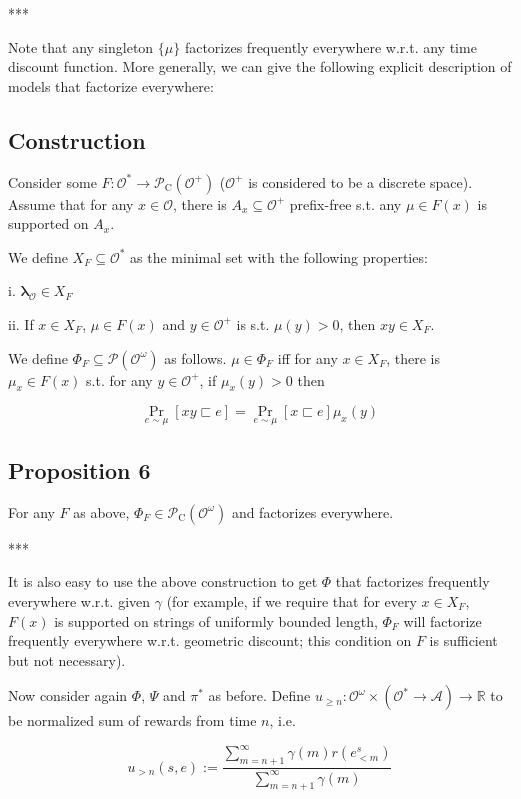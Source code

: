 \documentclass[a4paper]{article}
\DeclareMathOperator{\Prb}{Pr}
\newcommand{\Reals}{\mathbb{R}}
\newcommand{\Estr}{\bm{\lambda}}
\newcommand{\Prob}{\mathcal{P}}
\newcommand{\Act}{\mathcal{A}}
\newcommand{\Obs}{\mathcal{O}}
\newcommand{\ObsO}{\Obs^\omega}
\newcommand{\Pol}{\Obs^* \rightarrow \Act}
\newcommand{\CC}{\mathcal{P}_{\operatorname{C}}}
\begin{document}
***

Note that any singleton ${\{\mu\}}$ factorizes frequently everywhere w.r.t. any time discount function. More generally, we can give the following explicit description of models that factorize everywhere:

\subsection{Construction}

Consider some ${F: \Obs^* \rightarrow \CC(\Obs^+)}$ (${\Obs^+}$ is considered to be a discrete space). Assume that for any ${x \in \Obs}$, there is ${A_x \subseteq \Obs^+}$ prefix-free s.t. any ${\mu \in F(x)}$ is supported on ${A_x}$.

We define ${X_F \subseteq \Obs^*}$ as the minimal set with the following properties:

i. ${\Estr_\Obs \in X_F}$

ii. If ${x \in X_F}$, ${\mu \in F(x)}$ and ${y \in \Obs^+}$ is s.t. ${\mu(y) > 0}$, then ${xy \in X_F}$.

We define ${\Phi_F \subseteq \Prob(\ObsO)}$ as follows. ${\mu \in \Phi_F}$ iff for any ${x \in X_F}$, there is ${\mu_x \in F(x)}$ s.t. for any ${y \in \Obs^+}$, if ${\mu_x(y) > 0}$ then

$$\Prb_{e \sim \mu}[xy \sqsubset e] = \Prb_{e \sim \mu}[x \sqsubset e] \mu_x(y)$$

\subsection{Proposition 6}

For any ${F}$ as above, ${\Phi_F \in \CC(\ObsO)}$ and factorizes everywhere.

***

It is also easy to use the above construction to get ${\Phi}$ that factorizes frequently everywhere w.r.t. given ${\gamma}$ (for example, if we require that for every ${x \in X_F}$, ${F(x)}$ is supported on strings of uniformly bounded length, ${\Phi_F}$ will factorize frequently everywhere w.r.t. geometric discount; this condition on ${F}$ is sufficient but not necessary).

Now consider again ${\Phi}$, ${\Psi}$ and ${\pi^*}$ as before. Define ${u_{\geq n}: \ObsO \times (\Pol) \rightarrow \Reals}$ to be normalized sum of rewards from time ${n}$, i.e.

$$u_{> n}(s,e):=\frac{\sum_{m=n+1}^\infty \gamma(m)r(e^s_{<m})}{\sum_{m=n+1}^\infty \gamma(m)}$$
\end{document}
